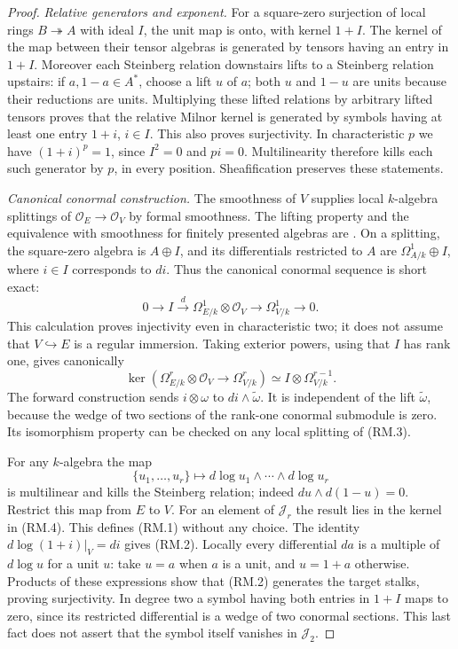 \begin{proof}
\emph{Relative generators and exponent.}
For a square-zero surjection of local rings $B\twoheadrightarrow A$
with ideal $I$, the unit map is onto, with kernel $1+I$. The kernel
of the map between their tensor algebras is generated by tensors
having an entry in $1+I$. Moreover each Steinberg relation downstairs
lifts to a Steinberg relation upstairs: if $a,1-a\in A^*$, choose
a lift $u$ of $a$; both $u$ and $1-u$ are units because their
reductions are units. Multiplying these lifted relations by arbitrary
lifted tensors proves that the relative Milnor kernel is generated
by symbols having at least one entry $1+i$, $i\in I$.
This also proves surjectivity. In characteristic $p$ we have
$(1+i)^p=1$, since $I^2=0$ and $pi=0$. Multilinearity therefore kills
each such generator by $p$, in every position. Sheafification
preserves these statements.

\emph{Canonical conormal construction.}
The smoothness of $V$ supplies local $k$-algebra splittings of
$\mathcal O_E\to\mathcal O_V$ by formal smoothness. The lifting
property and the equivalence with smoothness for finitely presented
algebras are \citet[Definition 10.138.1 and Proposition 10.138.13,
Tag 00TH]{frStacksFormalSmoothRelativeMilnor}.
On a splitting, the square-zero algebra is $A\oplus I$, and its
differentials restricted to $A$ are $\Omega^1_{A/k}\oplus I$,
where $i\in I$ corresponds to $di$. Thus the canonical conormal
sequence is short exact:
\[
 0\longrightarrow I\xrightarrow{d}
       \Omega^1_{E/k}\otimes\mathcal O_V
       \longrightarrow\Omega^1_{V/k}\longrightarrow0.
 \tag{RM.3}
\]
This calculation proves injectivity even in characteristic two;
it does not assume that $V\hookrightarrow E$ is a regular immersion.
Taking exterior powers, using that $I$ has rank one, gives canonically
\[
 \ker\left(\Omega^r_{E/k}\otimes\mathcal O_V
                    \longrightarrow\Omega^r_{V/k}\right)
       \simeq I\otimes\Omega^{r-1}_{V/k}.
 \tag{RM.4}
\]
The forward construction sends $i\otimes\omega$ to
$di\wedge\widetilde\omega$. It is independent of the lift
$\widetilde\omega$, because the wedge of two sections of the
rank-one conormal submodule is zero. Its isomorphism property can
be checked on any local splitting of (RM.3).

For any $k$-algebra the map
\[
 \{u_1,\ldots,u_r\}\longmapsto
          d\log u_1\wedge\cdots\wedge d\log u_r
\]
is multilinear and kills the Steinberg relation; indeed
$du\wedge d(1-u)=0$. Restrict this map from $E$ to $V$.
For an element of $\mathcal J_r$ the result lies in the kernel in
(RM.4). This defines (RM.1) without any choice. The identity
$d\log(1+i)|_V=di$ gives (RM.2). Locally every differential $da$
is a multiple of $d\log u$ for a unit $u$: take $u=a$ when $a$
is a unit, and $u=1+a$ otherwise. Products of these expressions
show that (RM.2) generates the target stalks, proving surjectivity.
In degree two a symbol having both entries in $1+I$ maps to zero,
since its restricted differential is a wedge of two conormal
sections. This last fact does not assert that the symbol itself
vanishes in $\mathcal J_2$.
\end{proof}

